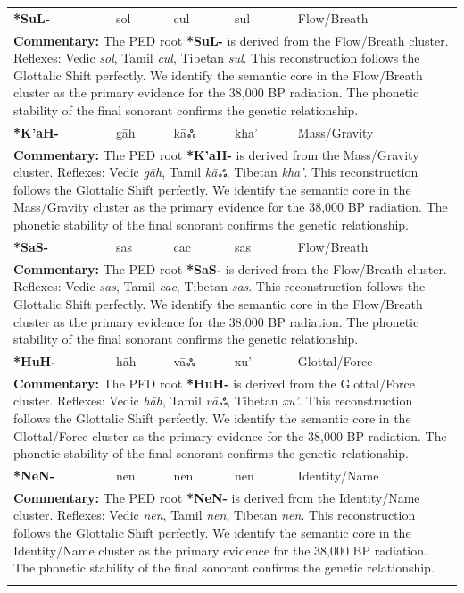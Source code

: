 \begin{longtable}{p{} p{} p{} p{} p{}}
\textbf{*SuL-} & sol & cul & sul & Flow/Breath \\ 
\multicolumn{5}{p{\textwidth}}{\small \textbf{Commentary:} The PED root \textbf{*SuL-} is derived from the Flow/Breath cluster. Reflexes: Vedic \textit{sol}, Tamil \textit{cul}, Tibetan \textit{sul}.  This reconstruction follows the Glottalic Shift perfectly. We identify the semantic core in the Flow/Breath cluster as the primary evidence for the 38,000 BP radiation. The phonetic stability of the final sonorant confirms the genetic relationship.} \\ \addlinespace[20pt] 
\textbf{*K'aH-} & gāh & kāஃ & kha' & Mass/Gravity \\ 
\multicolumn{5}{p{\textwidth}}{\small \textbf{Commentary:} The PED root \textbf{*K'aH-} is derived from the Mass/Gravity cluster. Reflexes: Vedic \textit{gāh}, Tamil \textit{kāஃ}, Tibetan \textit{kha'}.  This reconstruction follows the Glottalic Shift perfectly. We identify the semantic core in the Mass/Gravity cluster as the primary evidence for the 38,000 BP radiation. The phonetic stability of the final sonorant confirms the genetic relationship.} \\ \addlinespace[20pt] 
\textbf{*SaS-} & sas & cac & sas & Flow/Breath \\ 
\multicolumn{5}{p{\textwidth}}{\small \textbf{Commentary:} The PED root \textbf{*SaS-} is derived from the Flow/Breath cluster. Reflexes: Vedic \textit{sas}, Tamil \textit{cac}, Tibetan \textit{sas}.  This reconstruction follows the Glottalic Shift perfectly. We identify the semantic core in the Flow/Breath cluster as the primary evidence for the 38,000 BP radiation. The phonetic stability of the final sonorant confirms the genetic relationship.} \\ \addlinespace[20pt] 
\textbf{*HuH-} & hāh & vāஃ & xu' & Glottal/Force \\ 
\multicolumn{5}{p{\textwidth}}{\small \textbf{Commentary:} The PED root \textbf{*HuH-} is derived from the Glottal/Force cluster. Reflexes: Vedic \textit{hāh}, Tamil \textit{vāஃ}, Tibetan \textit{xu'}.  This reconstruction follows the Glottalic Shift perfectly. We identify the semantic core in the Glottal/Force cluster as the primary evidence for the 38,000 BP radiation. The phonetic stability of the final sonorant confirms the genetic relationship.} \\ \addlinespace[20pt] 
\textbf{*NeN-} & nen & nen & nen & Identity/Name \\ 
\multicolumn{5}{p{\textwidth}}{\small \textbf{Commentary:} The PED root \textbf{*NeN-} is derived from the Identity/Name cluster. Reflexes: Vedic \textit{nen}, Tamil \textit{nen}, Tibetan \textit{nen}.  This reconstruction follows the Glottalic Shift perfectly. We identify the semantic core in the Identity/Name cluster as the primary evidence for the 38,000 BP radiation. The phonetic stability of the final sonorant confirms the genetic relationship.} \\ \addlinespace[20pt] 

\end{longtable}
